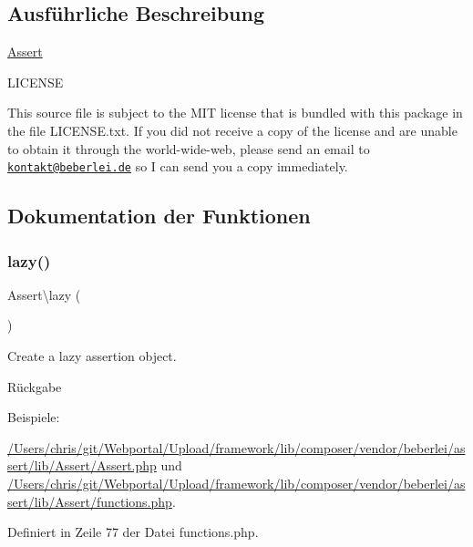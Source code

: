 \subsection{Ausführliche Beschreibung}
\mbox{\hyperlink{namespace_assert}{Assert}}

L\+I\+C\+E\+N\+SE

This source file is subject to the M\+IT license that is bundled with this package in the file L\+I\+C\+E\+N\+S\+E.\+txt. If you did not receive a copy of the license and are unable to obtain it through the world-\/wide-\/web, please send an email to \href{mailto:kontakt@beberlei.de}{\tt kontakt@beberlei.\+de} so I can send you a copy immediately. 

\subsection{Dokumentation der Funktionen}
\mbox{\label{namespace_assert_a46e40540c897ee751f88a5a37a38dd4d}} 
\subsubsection{\texorpdfstring{lazy()}{lazy()}}
{\footnotesize\ttfamily Assert\textbackslash{}lazy (\begin{DoxyParamCaption}{ }\end{DoxyParamCaption})}

Create a lazy assertion object.

\begin{DoxyReturn}{Rückgabe}

\end{DoxyReturn}
\begin{Desc}
\item[Beispiele\+: ]\par
\mbox{\hyperlink{_2_users_2chris_2git_2_webportal_2_upload_2framework_2lib_2composer_2vendor_2beberlei_2assert_2lacf450f68139c1e41d10488936b869cb}{/\+Users/chris/git/\+Webportal/\+Upload/framework/lib/composer/vendor/beberlei/assert/lib/\+Assert/\+Assert.\+php}} und \mbox{\hyperlink{_2_users_2chris_2git_2_webportal_2_upload_2framework_2lib_2composer_2vendor_2beberlei_2assert_2l71b2cff1f382ea0076479e3e4857df11}{/\+Users/chris/git/\+Webportal/\+Upload/framework/lib/composer/vendor/beberlei/assert/lib/\+Assert/functions.\+php}}.\end{Desc}


Definiert in Zeile 77 der Datei functions.\+php.

